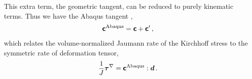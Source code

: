 \documentclass[10pt,letterpaper,oneside]{report}
\newcommand{\ten}[1]{\mbox{\boldmath $#1$}{}}
\newcommand{\tenf}[1]{\mbox{{\sffamily{\bfseries {#1}}}}}
\begin{document}
This extra term, the geometric tangent, can be reduced to purely kinematic terms.  Thus we have the Abaqus tangent \autocite{Prot2009,Bower},
\begin{equation}
\tenf{c}^\text{Abaqus} =  \tenf{c} + \tenf{c}' \, , 
\end{equation}
which relates the volume-normalized Jaumann rate of the Kirchhoff stress to the symmetric rate of deformation tensor, 
\begin{equation}
\frac{1}{J} \ten{\tau}^{\nabla } = \tenf{c}^\text{Abaqus} : \ten{d} \, .
\end{equation}
\end{document}
